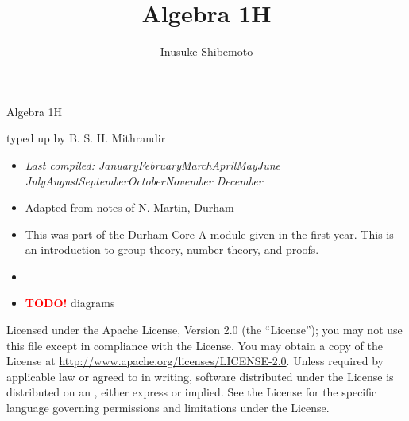 \documentclass[letter-paper]{tufte-book}
\title{Algebra 1H}
\author[]{Inusuke Shibemoto}
\newcommand{\monthyear}{%
  \ifcase\month\or January\or February\or March\or April\or May\or June\or
  July\or August\or September\or October\or November\or
  December\fi\space\number\year
}
\newcommand{\TODO}{\textcolor{red}{\bf TODO!}\xspace}
\begin{document}



\chapter*{}

\begin{fullwidth}

\par \begin{center}{\Huge Algebra 1H}\end{center}

\vspace*{5mm}

\par \begin{center}{\Large typed up by B. S. H. Mithrandir}\end{center}

\vspace*{5mm}

\begin{itemize}
  \item \textit{Last compiled: \monthyear}
  \item Adapted from notes of N. Martin, Durham
  \item This was part of the Durham Core A module given in the first year. This
  is an introduction to group theory, number theory, and proofs.
  \item[]
  \item \TODO diagrams
\end{itemize}

\par

\par Licensed under the Apache License, Version 2.0 (the ``License''); you may not
use this file except in compliance with the License. You may obtain a copy
of the License at \url{http://www.apache.org/licenses/LICENSE-2.0}. Unless
required by applicable law or agreed to in writing, software distributed
under the License is distributed on an , either express or implied. See the
License for the specific language governing permissions and limitations
under the License.
\end{fullwidth}
\end{document}
